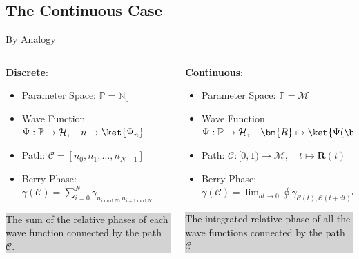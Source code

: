 \documentclass[9pt]{beamer}
\begin{document}
\subsection{The Continuous Case}
\begin{frame}{By Analogy}
  
  \begin{columns}
    \begin{column}{0.5\textwidth}
      
      \textbf{Discrete}:
      \begin{itemize}
        \item Parameter Space: $\mathbb{P} = \mathbb{N}_{0}$
        \item Wave Function $\Psi: \mathbb{P} \rightarrow \mathcal{H}, \quad 
              n \mapsto \ket{\Psi_{n}}$
        \item Path: $\mathcal{C} = [n_{0}, n_{1}, \ldots, n_{N-1}]$
        \item Berry Phase: $\gamma(\mathcal{C}) = \sum_{i = 0}^{N} \gamma_{n_{i \; 
              \mathrm{mod} \; N}, n_{i+1 \; \mathrm{mod} \; N}}$\\

      \end{itemize}

      \vspace{3ex}
      \colorbox{lightgray}
      {
        \begin{minipage}{\textwidth}
          The sum of the relative phases of each wave function connected by the path 
          $\mathcal{C}$.
        \end{minipage}
      }
    \end{column}
    \begin{column}{0.5\textwidth}
  
      \textbf{Continuous}:
      \begin{itemize}
        \item Parameter Space: $\mathbb{P} = \mathcal{M}$
        \item Wave Function $\Psi: \mathbb{P} \rightarrow \mathcal{H}, \quad \bm{R}
              \mapsto \ket{\Psi(\bm{R})}$
        \item Path: $\mathcal{C}: [0, 1) \rightarrow \mathcal{M}, \quad t \mapsto 
              \bm{R}(t)$
        \item Berry Phase: $\gamma(\mathcal{C}) = \lim_{dt \to 0} \oint
              \gamma_{\mathcal{C}(t), \mathcal{C}(t + dt)} d \bm{R}$
      \end{itemize}
      \vspace{3ex}
      \colorbox{lightgray}
      {
        \begin{minipage}{\textwidth}
          The integrated relative phase of all the wave functions connected by the path 
          $\mathcal{C}.$
        \end{minipage}
      }
    \end{column}
  \end{columns}

\end{frame}
\end{document}
